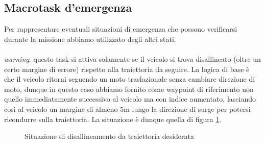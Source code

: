\documentclass{article}
\begin{document}
        \newpage
        \subsection{Macrotask d'emergenza}

            Per rappresentare eventuali situazioni di emergenza che possono verificarsi durante la missione abbiamo utilizzato degli altri stati.\\
            \\
            \emph{warning}: questo task si attiva solamente se il veicolo si trova disallineato (oltre un certo margine di errore) 
            rispetto alla traiettoria da seguire. La logica di base è che il 
            veicolo ritorni seguendo un moto traslazionale senza cambiare direzione di moto, dunque in questo caso abbiamo fornito come waypoint di riferimento 
            non quello immediatamente successivo al veicolo ma con indice aumentato, lasciando così al veicolo un margine di almeno 5m lungo la direzione di surge 
            per potersi ricondurre sulla traiettoria. La situazione è dunque quella di figura \ref{fig:disallineamento}.

            \begin{figure} [ht]
                \caption{Situazione di disallineamento da traiettoria desiderata}
                \label{fig:disallineamento}
            \end{figure} 
                
\end{document}
